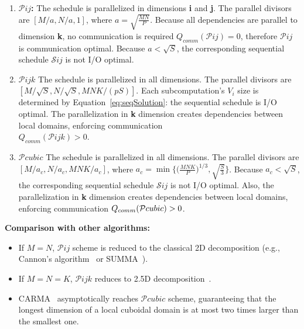 \documentclass[sigplan,review,anonymous]{acmart}\settopmatter{printfolios=true,printccs=false,printacmref=false}
\newcommand{\macb}[1]{\textbf{\textsf{#1}}}
\begin{document}
\begin{enumerate}
  \item \textbf{$\mathcal{P}ij$:} 
  The schedule is parallelized in dimensions \textbf{i} and 
  \textbf{j}. The parallel divisors are $[M/a , N/a, 1]$, where $a = 
  \sqrt{\frac{MN}{P}}$.
  Because all dependencies are parallel to dimension \textbf{k}, no 
  communication is required $Q_{comm}(\mathcal{P}ij) = 0$, therefore 
  $\mathcal{P}ij$ is communication optimal. Because $a < \sqrt{S}$, the 
  corresponding sequential schedule $\mathcal{S}ij$ is not I/O optimal.
  \item \textbf{$\mathcal{P}ijk$} The schedule is parallelized in all 
  dimensions. The parallel divisors are $[M/\sqrt{S} , N/\sqrt{S}, 
  MNK/(pS)]$.
   Each subcomputation's $V_i$ size is determined by 
  Equation~\ref{eq:seqSolution}: the sequential schedule is I/O optimal. The 
  parallelization in \textbf{k} dimension creates dependencies between local 
  domains, enforcing communication \\ $Q_{comm}(\mathcal{P}ijk) > 0$. 
  \item \textbf{$\mathcal{P}cubic$} The schedule is parallelized in all 
  dimensions. The parallel divisors are $[M/a_c , N/a_c, 
  MNK/a_c]$, where $a_c = 
  \min\Big\{\big(\frac{MNK}{P}\big)^{1/3}, 
  \sqrt{\frac{S}{3}}\Big\}$. Because $a_c < \sqrt{S}$, the 
  corresponding sequential schedule $\mathcal{S}ij$ is not I/O optimal. 
  Also,  the 
  parallelization in \textbf{k} dimension creates dependencies between local 
  domains, enforcing communication $Q_{comm}(\mathcal{P}cubic) >\nobreak 0$. 
\end{enumerate}

\macb{Comparison with other algorithms:}

\begin{itemize}
  \item If $M = N$, $\mathcal{P}ij$ scheme is reduced to the
  classical 2D 
  decomposition (e.g., Cannon's algorithm~\cite{Cannon} or 
  SUMMA~\cite{summa}). 
  \item If $M = N = K$, $\mathcal{P}ijk$ reduces to 2.5D 
  decomposition~\cite{25d}.
  \item CARMA~\cite{CARMA} asymptotically reaches $\mathcal{P}cubic$
  scheme, 
  guaranteeing that 
  the longest dimension of a local cuboidal domain is at most two times 
  larger than the 
  smallest one.
\end{itemize}
\end{document}
